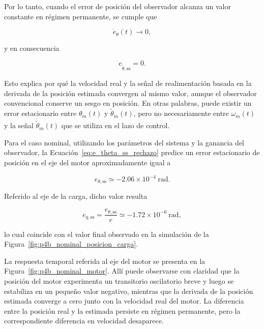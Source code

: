 \documentclass[10pt,a4paper]{article}
\begin{document}
Por lo tanto, cuando el error de posición del observador alcanza un valor
constante en régimen permanente, se cumple que

\begin{equation*}
	\dot e_{\theta}(t)\rightarrow 0,
\end{equation*}

y en consecuencia

\begin{equation*}
	\boxed{
		e_{\dot{\widetilde{\theta}},\mathrm{ss}}
		=
		0
	}.
	\label{eq:error_velocidad_fb_ss}
\end{equation*}

Esto explica por qué la velocidad real y la señal de realimentación
basada en la derivada de la posición estimada convergen al mismo valor,
aunque el observador convencional conserve un sesgo en posición. En otras
palabras, puede existir un error estacionario entre
$\theta_m(t)$ y $\widetilde{\theta}_m(t)$, pero no necesariamente entre
$\omega_m(t)$ y la señal $\dot{\widetilde{\theta}}_m(t)$ que se utiliza en
el lazo de control.

Para el caso nominal, utilizando los parámetros del sistema y la ganancia
del observador, la Ecuación~\eqref{eq:e_theta_ss_rechazo} predice un error
estacionario de posición en el eje del motor aproximadamente igual a

\begin{equation*}
	e_{\theta,\mathrm{ss}}
	\simeq
	-2.06\times10^{-4}\ \mathrm{rad}.
	\label{eq:e_theta_ss_num_rechazo}
\end{equation*}

Referido al eje de la carga, dicho valor resulta

\begin{equation*}
	e_{q,\mathrm{ss}}
	=
	\frac{e_{\theta,\mathrm{ss}}}{r}
	\simeq
	-1.72\times10^{-6}\ \mathrm{rad},
	\label{eq:eq_ss_num_rechazo}
\end{equation*}

lo cual coincide con el valor final observado en la simulación de la
Figura~\ref{fig:p4b_nominal_posicion_carga}.

La respuesta temporal referida al eje del motor se presenta en la
Figura~\ref{fig:p4b_nominal_motor}. Allí puede observarse con claridad que
la posición del motor experimenta un transitorio oscilatorio breve y luego
se estabiliza en un pequeño valor negativo, mientras que la derivada de la
posición estimada converge a cero junto con la velocidad real del motor.
La diferencia entre la posición real y la estimada persiste en régimen
permanente, pero la correspondiente diferencia en velocidad desaparece.
\end{document}
